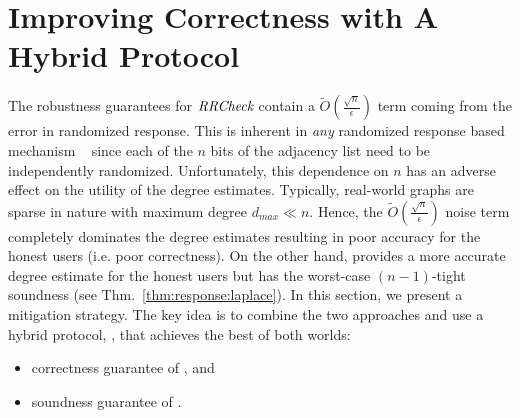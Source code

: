 \section{Improving Correctness with A Hybrid Protocol}\label{sec:hybrid}
The robustness guarantees for $\textit{RRCheck}{}$ contain a $\tilde{O}(\frac{\sqrt{n}}{\epsilon})$ term coming from the error in randomized response.
This is inherent in \textit{any} randomized response based mechanism  ~\cite{error1,error2,error3} since each of the $n$ bits of the adjacency list need to be independently randomized. Unfortunately, this dependence on $n$ has an adverse effect on the utility of the degree estimates. Typically, real-world graphs are sparse in nature with maximum degree $d_{max}\ll n$. Hence, the $\tilde{O}(\frac{\sqrt{n}}{\epsilon})$ noise term completely dominates the degree estimates resulting in poor accuracy for the honest users %
(i.e. poor correctness). On the other hand, \RLap{} provides a more accurate degree estimate for the honest users but has the worst-case $(n-1)$-tight soundness (see Thm.~\ref{thm:response:laplace}). In this section, we present a mitigation strategy. The key idea is to combine the two approaches and use a hybrid protocol, \DegHybrid, that achieves the best of both worlds: 
\begin{itemize} \item correctness guarantee of \RLap, and \item soundness guarantee of \DegRRCheck. \end{itemize}

